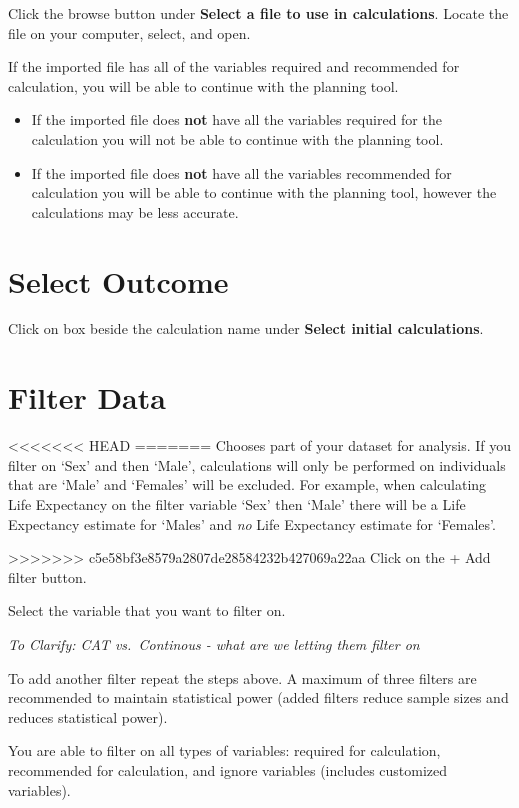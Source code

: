 \documentclass[]{book}
\begin{document}
Click the browse button under \textbf{Select a file to use in
calculations}. Locate the file on your computer, select, and open.

If the imported file has all of the variables required and recommended
for calculation, you will be able to continue with the planning tool.

\begin{itemize}
\item
  If the imported file does \textbf{not} have all the variables required
  for the calculation you will not be able to continue with the planning
  tool.
\item
  If the imported file does \textbf{not} have all the variables
  recommended for calculation you will be able to continue with the
  planning tool, however the calculations may be less accurate.
\end{itemize}

\section{Select Outcome}\label{select-outcome}

Click on box beside the calculation name under \textbf{Select initial
calculations}.

\section{Filter Data}\label{filter-data}

<<<<<<< HEAD
=======
Chooses part of your dataset for analysis. If you filter on
`Sex' and then `Male', calculations will only be performed on
individuals that are `Male' and `Females' will be excluded. For example,
when calculating Life Expectancy on the filter variable `Sex' then
`Male' there will be a Life Expectancy estimate for `Males' and
\emph{no} Life Expectancy estimate for `Females'.

>>>>>>> c5e58bf3e8579a2807de28584232b427069a22aa
Click on the + Add filter button.

Select the variable that you want to filter on.

\emph{To Clarify: CAT vs.~Continous - what are we letting them filter
on}

To add another filter repeat the steps above. A maximum of three filters
are recommended to maintain statistical power (added filters reduce
sample sizes and reduces statistical power).

You are able to filter on all types of variables: required for
calculation, recommended for calculation, and ignore variables (includes
customized variables).
\end{document}
